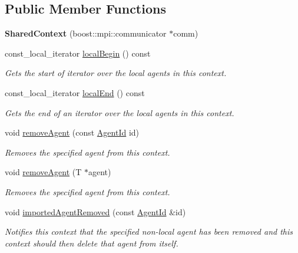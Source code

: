 \subsection*{Public Member Functions}
\begin{DoxyCompactItemize}
\item 
\hypertarget{classrepast_1_1_shared_context_a13008265474e088cc155d4dea800bb1c}{{\bfseries Shared\-Context} (boost\-::mpi\-::communicator $\ast$comm)}\label{classrepast_1_1_shared_context_a13008265474e088cc155d4dea800bb1c}

\item 
const\-\_\-local\-\_\-iterator \hyperlink{classrepast_1_1_shared_context_a65b7e68261aba30e53cc1935020bd4f3}{local\-Begin} () const 
\begin{DoxyCompactList}\small\item\em Gets the start of iterator over the local agents in this context. \end{DoxyCompactList}\item 
const\-\_\-local\-\_\-iterator \hyperlink{classrepast_1_1_shared_context_a4040d23e1b0636967a8bba895433fa49}{local\-End} () const 
\begin{DoxyCompactList}\small\item\em Gets the end of an iterator over the local agents in this context. \end{DoxyCompactList}\item 
void \hyperlink{classrepast_1_1_shared_context_a958b4a5063ece7992c937dbc612cd339}{remove\-Agent} (const \hyperlink{classrepast_1_1_agent_id}{Agent\-Id} id)
\begin{DoxyCompactList}\small\item\em Removes the specified agent from this context. \end{DoxyCompactList}\item 
void \hyperlink{classrepast_1_1_shared_context_a89e71c4275d8a31caa5e62c32f16c050}{remove\-Agent} (T $\ast$agent)
\begin{DoxyCompactList}\small\item\em Removes the specified agent from this context. \end{DoxyCompactList}\item 
void \hyperlink{classrepast_1_1_shared_context_ae0695338eefe31bee634e094a8e33071}{imported\-Agent\-Removed} (const \hyperlink{classrepast_1_1_agent_id}{Agent\-Id} \&id)
\begin{DoxyCompactList}\small\item\em Notifies this context that the specified non-\/local agent has been removed and this context should then delete that agent from itself. \end{DoxyCompactList}\item 

\end{DoxyCompactItemize}
